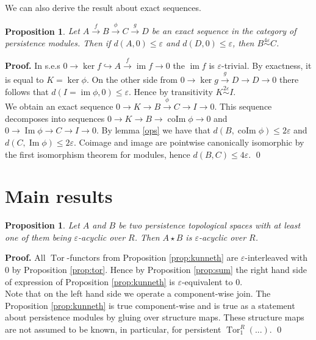\documentclass[english,12pt]{article}
\newcounter{stmcounter}[section]
\numberwithin{equation}{section}
\newtheorem{proposition}[stmcounter]{Proposition}
\theoremstyle{definition}
\theoremstyle{remark}
\newenvironment{pf}{\noindent\textbf{Proof.}}{\qed}
\renewcommand{\leq}{\leqslant}
\begin{document}
We can also derive the result about exact sequences.\\

\begin{proposition}
  \label{major}
  Let $A \xrightarrow{f} B \xrightarrow{\phi} C \xrightarrow{g} D$ be an exact sequence in the category of persistence modules. Then if $d(A,0) \leq \varepsilon$ and $d(D,0) \leq \varepsilon$, then $B \stackrel{4\varepsilon}{\sim} C$.
\end{proposition}

\begin{pf}
  In s.e.s $0 \to \ker{f} \hookrightarrow A \xrightarrow{f} \operatorname{im}f \to 0$ the $\operatorname{im}f$ is $\varepsilon$-trivial. By exactness, it is equal to $K = \ker \phi$. On the other side from $0 \to \ker{g} \xrightarrow{g} D \to D \to 0$ there follows that $d(I = \operatorname{im} \phi, 0) \leq \varepsilon$. Hence by transitivity $K \stackrel{2\varepsilon}{\sim} I$.\\

  We obtain an exact sequence $0 \to K \to B \xrightarrow{\phi} C \to I \to 0$. This sequence decomposes into sequences $0 \to K \to B \to \operatorname{coIm}\phi \to 0$ and $0 \to \operatorname{Im}\phi \to C \to I \to 0$. By lemma \ref{ops} we have that $d(B,\operatorname{coIm}\phi) \leq 2\varepsilon$ and $d(C,\operatorname{Im}\phi) \leq 2\varepsilon$. Coimage and image are pointwise canonically isomorphic by the first isomorphism theorem for modules, hence $d(B, C) \leq 4\varepsilon$.
\end{pf}\\

\section{Main results}

\begin{proposition}
  \label{prop:acyclic}
  Let $A$ and $B$ be two persistence topological spaces with at least one of them being $\varepsilon$-acyclic over $R$. Then $A \star B$ is $\varepsilon$-acyclic over $R$.
\end{proposition}

\begin{pf}
  All $\operatorname{Tor}$-functors from Proposition \ref{prop:kunneth} are $\varepsilon$-interleaved with $0$ by Proposition \ref{prop:tor}. Hence by Proposition \ref{prop:sum} the right hand side of expression of Proposition \ref{prop:kunneth} is $\varepsilon$-equivalent to $0$.\\
  
  Note that on the left hand side we operate a component-wise join. The Proposition \ref{prop:kunneth} is true component-wise and is true as a statement about persistence modules by gluing over structure maps. These structure maps are not assumed to be known, in particular, for persistent $\operatorname{Tor}_1^R(...)$.
\end{pf}\\
\end{document}

